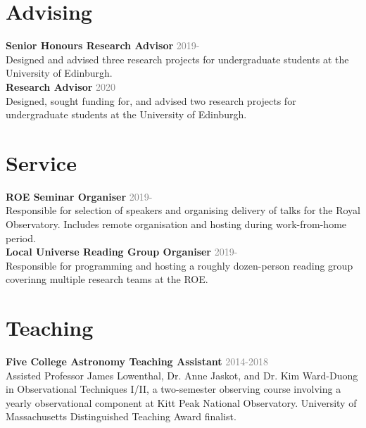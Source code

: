 \documentclass[margin, 11pt]{res} %
\begin{document}
\begin{resume}
%


\section{\sc \textcolor{redshade}{Advising}}


{\bf Senior Honours Research Advisor} \hfill\textcolor{grey}{2019-}\\
Designed and advised three research projects for undergraduate students at the University of Edinburgh.\\

{\bf Research Advisor} \hfill\textcolor{grey}{2020}\\
Designed, sought funding for, and advised two research projects for undergraduate students at the University of Edinburgh.



\section{\sc \textcolor{redshade}{Service}}

{\bf ROE Seminar Organiser} \hfill\textcolor{grey}{2019-}\\
Responsible for selection of speakers and organising delivery of talks for the Royal Observatory. Includes remote organisation and hosting during work-from-home period.\\

{\bf Local Universe Reading Group Organiser} \hfill\textcolor{grey}{2019-}\\
Responsible for programming and hosting a roughly dozen-person reading group coverinng multiple research teams at the ROE.

\section{\sc \textcolor{redshade}{Teaching}}

{\bf Five College Astronomy Teaching Assistant} \hfill \textcolor{grey}{2014-2018}\\
Assisted Professor James Lowenthal, Dr. Anne Jaskot, and Dr. Kim Ward-Duong in Observational Techniques I/II, a two-semester observing course involving a yearly observational component at Kitt Peak National Observatory. University of Massachusetts Distinguished Teaching Award finalist.\\


\end{resume}
\end{document}
